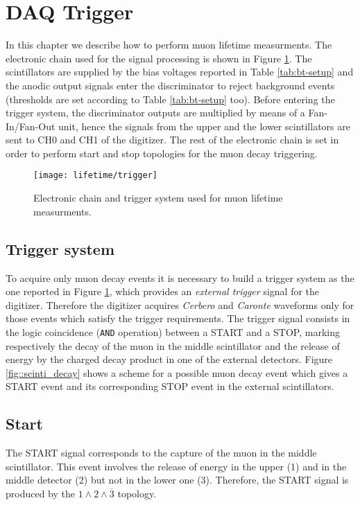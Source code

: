 \section{DAQ Trigger}
In this chapter we describe how to perform muon lifetime measurments. The electronic chain used for the signal processing is shown in Figure \ref{fig::trigger}.
The scintillators are supplied by the bias voltages reported in Table \ref{tab:bt-setup} and the anodic output signals enter the discriminator to reject background events (thresholds are set according to Table \ref{tab:bt-setup} too).
Before entering the trigger system, the discriminator outputs are multiplied by means of a Fan-In/Fan-Out unit, hence the signals from the upper and the lower scintillators are sent to CH0 and CH1 of the digitizer. The rest of the electronic chain is set in order to perform start and stop topologies for the muon decay triggering. 

\begin{figure}[!h]
	\centering
	\texttt{[image: lifetime/trigger]}
	\caption{Electronic chain and trigger system used for muon lifetime measurments.}
	\label{fig::trigger}
\end{figure}

\subsection{Trigger system}
To acquire only muon decay events it is necessary to build a trigger system as the one reported in Figure \ref{fig::trigger}, which provides an \emph{external trigger} signal for the digitizer. Therefore the digitizer acquires \emph{Cerbero} and \emph{Caronte} waveforms only for those events which satisfy the trigger requirements.
The trigger signal consists in the logic coincidence (\texttt{AND} operation) between a START and a STOP, marking respectively the decay of the muon in the middle scintillator and the release of energy by the charged decay product in one of the external detectors. Figure \ref{fig::scinti_decay} shows a scheme for a possible muon decay event which gives a START event and its corresponding STOP event in the external scintillators.

\subsection{Start}
The START signal corresponds to the capture of the muon in the middle scintillator. This event involves the release of energy in the upper (1) and in the middle detector (2) but not in the lower one (3). Therefore, the START signal is produced by the $1 \wedge 2 \wedge \overline{3}$ topology.\\

